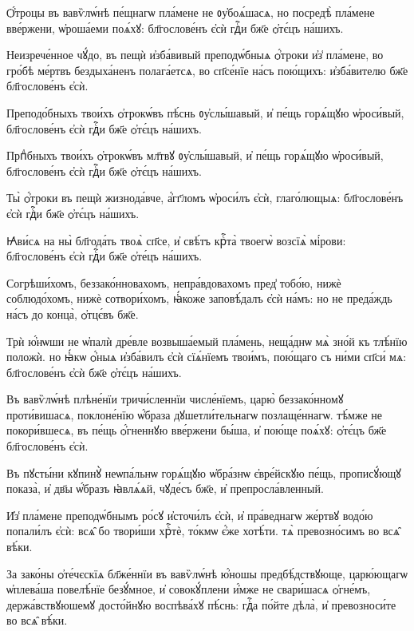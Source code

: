 \hKv Ѻ҆́троцы въ вавѷлѡ́нѣ пе́щнагѡ  пла́мене не ᲂу҆боѧ́шасѧ, но посредѣ̀ пла́мене вве́ржени,  ѡ҆роша́еми поѧ́хꙋ: бл҃гослове́нъ є҆сѝ гдⷭ҇и бж҃е ѻ҆тє́цъ  на́шихъ. 
%

\hKv Неизрече́нное чꙋ́до, въ пещѝ  и҆зба́вивый преподѡ́бныѧ ѻ҆́троки и҆з̾ пла́мене, во  гро́бѣ ме́ртвъ бездыха́ненъ полага́етсѧ, во сп҃се́нїе на́съ  пою́щихъ: и҆зба́вителю бж҃е бл҃гослове́нъ є҆сѝ. 
%

\hKv Преподо́бныхъ твои́хъ ѻ҆трокѡ́въ пѣ́снь ᲂу҆слы́шавый, и҆  пе́щь горѧ́щꙋю ѡ҆роси́вый, бл҃гослове́нъ є҆сѝ гдⷭ҇и бж҃е  ѻ҆тє́цъ на́шихъ.  

\hKv Прпⷣбныхъ твои́хъ ѻ҆трокѡ́въ мл҃твꙋ ᲂу҆слы́шавый, и҆  пе́щь горѧ́щꙋю ѡ҆роси́вый, бл҃гослове́нъ є҆сѝ гдⷭ҇и бж҃е  ѻ҆тє́цъ на́шихъ. 

\hKv Ты̀ ѻ҆́троки въ пещѝ жизнода́вче, а҆́гг҃ломъ ѡ҆роси́лъ  є҆сѝ, глаго́лющыѧ: бл҃гослове́нъ є҆сѝ гдⷭ҇и бж҃е  ѻ҆тє́цъ на́шихъ. 

\hKv Ꙗ҆ви́сѧ на ны̀ бл҃года́ть твоѧ̀ сп҃се, и҆ свѣ́тъ крⷭ҇та̀  твоегѡ̀ возсїѧ̀ мі́рови: бл҃гослове́нъ є҆сѝ гдⷭ҇и бж҃е  ѻ҆те́цъ на́шихъ. 

\hKv Согрѣши́хомъ, беззако́нновахомъ, непра́вдовахомъ пред̾  тобо́ю, нижѐ соблюдо́хомъ, нижѐ сотвори́хомъ, ꙗ҆́коже  заповѣ́далъ є҆сѝ на́мъ: но не преда́ждь на́съ до конца̀,  ѻ҆тцє́въ бж҃е. 

\hKv Трѝ ю҆́нѡши не ѡ҆палѝ дре́вле возвыша́емый пла́мень,  неща́днѡ мѧ̀ зно́й къ тлѣ́нїю положѝ. но ꙗ҆́кѡ ѻ҆́ныѧ  и҆зба́вилъ є҆сѝ сїѧ́нїемъ твои́мъ, пою́щаго съ ни́ми  сп҃си́ мѧ: бл҃гослове́нъ є҆сѝ бж҃е ѻ҆тє́цъ на́шихъ. 

\hKv Въ вавѷлѡ́нѣ плѣне́нїи тричи́сленнїи числе́нїемъ, царю̀  беззако́нномꙋ   проти́вишасѧ,  поклоне́нїю ѡ҆́браза дꙋшетли́тельнагѡ позлаще́ннагѡ. тѣ́мже  не покори́вшесѧ, въ пе́щь ѻ҆́гненнꙋю вве́ржени бы́ша, и҆  пою́ще поѧ́хꙋ: ѻ҆тє́цъ бж҃е бл҃гослове́нъ є҆сѝ. 

\hKv Въ пꙋсты́ни кꙋпинꙋ̀ неѡпа́льнѡ горѧ́щꙋю ѡ҆бра́знѡ  є҆вре́йскꙋю пе́щь, прописꙋ́ющꙋ показа̀, и҆ дв҃ы ѡ҆́бразъ  ꙗ҆влѧ́ѧй, чꙋде́съ бж҃е, и҆ препросла́вленный. 
%

\hKv И҆з̾ пла́мене преподѡ́бнымъ ро́сꙋ и҆сточи́лъ є҆сѝ, и҆  пра́веднагѡ же́ртвꙋ водо́ю попали́лъ є҆сѝ: всѧ̑ бо  твори́ши хрⷭ҇тѐ, то́кмѡ є҆́же хотѣ́ти. тѧ̀ превозно́симъ  во всѧ̑ вѣ́ки. 
%

\hKv За зако́ны ѻ҆те́чєскїѧ  бл҃же́ннїи въ вавѷлѡ́нѣ ю҆́ношы предбѣ́дствꙋюще,  царю́ющагѡ ѡ҆плева́ша повелѣ́нїе безꙋ́мное, и҆ совокꙋ́плени  и҆́мже не свари́шасѧ ѻ҆гне́мъ, держа́вствꙋюшемꙋ досто́йнꙋю   воспѣва́хꙋ пѣ́снь: гдⷭ҇а по́йте  дѣла̀, и҆ превозноси́те во всѧ̑ вѣ́ки. 
%

